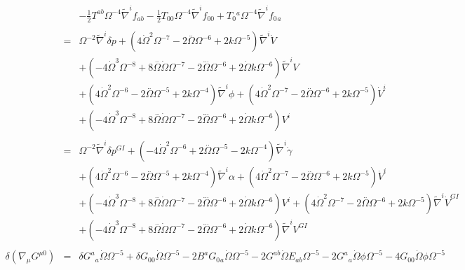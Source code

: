 \documentclass[10pt,letterpaper]{article}
\numberwithin{equation}{section}
\begin{document}
\begin{eqnarray}
&& -  \tfrac{1}{2} T^{ab} \Omega^{-4} \tilde{\nabla}^{i}f_{ab} -  \tfrac{1}{2} T_{00}{} \Omega^{-4} \tilde{\nabla}^{i}f_{00}{} + T_{0}{}^{a} \Omega^{-4} \tilde{\nabla}^{i}f_{0}{}_{a}
\\  \nonumber\\ 
&=& \Omega^{-2} \tilde{\nabla}^{i}\delta p + (4 \dot{\Omega}^2 \Omega^{-7} - 2 \overset{..}{\Omega} \Omega^{-6} + 2 k \Omega^{-5}) \tilde{\nabla}^{i}\dot{V} \nonumber \\ 
&& + (-4 \dot{\Omega}^3 \Omega^{-8} + 8 \overset{..}{\Omega} \dot{\Omega} \Omega^{-7} - 2 \overset{...}{\Omega} \Omega^{-6} + 2 \dot{\Omega} k \Omega^{-6}) \tilde{\nabla}^{i}V \nonumber \\ 
&& + (4 \dot{\Omega}^2 \Omega^{-6} - 2 \overset{..}{\Omega} \Omega^{-5} + 2 k \Omega^{-4}) \tilde{\nabla}^{i}\phi +(4 \dot{\Omega}^2 \Omega^{-7} - 2 \overset{..}{\Omega} \Omega^{-6} + 2 k \Omega^{-5}) \dot{V}^{i} \nonumber \\ 
&& + (-4 \dot{\Omega}^3 \Omega^{-8} + 8 \overset{..}{\Omega} \dot{\Omega} \Omega^{-7} - 2 \overset{...}{\Omega} \Omega^{-6} + 2 \dot{\Omega} k \Omega^{-6}) V^{i}
\\  \nonumber\\ 
&=& \Omega^{-2} \tilde{\nabla}^{i}\delta p^{GI}{} + (-4 \dot{\Omega}^2 \Omega^{-6} + 2 \overset{..}{\Omega} \Omega^{-5} - 2 k \Omega^{-4}) \tilde{\nabla}^{i}\dot{\gamma} \nonumber \\ 
&& + (4 \dot{\Omega}^2 \Omega^{-6} - 2 \overset{..}{\Omega} \Omega^{-5} + 2 k \Omega^{-4}) \tilde{\nabla}^{i}\alpha +(4 \dot{\Omega}^2 \Omega^{-7} - 2 \overset{..}{\Omega} \Omega^{-6} + 2 k \Omega^{-5}) \dot{V}^{i} \nonumber \\ 
&& + (-4 \dot{\Omega}^3 \Omega^{-8} + 8 \overset{..}{\Omega} \dot{\Omega} \Omega^{-7} - 2 \overset{...}{\Omega} \Omega^{-6} + 2 \dot{\Omega} k \Omega^{-6}) V^{i} + (4 \dot{\Omega}^2 \Omega^{-7} - 2 \overset{..}{\Omega} \Omega^{-6} + 2 k \Omega^{-5}) \tilde{\nabla}^{i}\dot{V}^{GI}{} \nonumber \\ 
&& + (-4 \dot{\Omega}^3 \Omega^{-8} + 8 \overset{..}{\Omega} \dot{\Omega} \Omega^{-7} - 2 \overset{...}{\Omega} \Omega^{-6} + 2 \dot{\Omega} k \Omega^{-6}) \tilde{\nabla}^{i}V^{GI}{}
\\ \nonumber\\
\delta(\nabla_\mu G^{\mu 0})&=& \delta G^{a}{}_{a} \dot{\Omega} \Omega^{-5} + \delta G_{00}{} \dot{\Omega} \Omega^{-5} - 2 B^{a} G_{0}{}_{a} \dot{\Omega} \Omega^{-5} - 2 G^{ab} \dot{\Omega} E_{ab} \Omega^{-5} - 2 G^{a}{}_{a} \dot{\Omega} \phi \Omega^{-5} - 4 G_{00}{} \dot{\Omega} \phi \Omega^{-5} \nonumber \\ 

\end{eqnarray}
\end{document}
